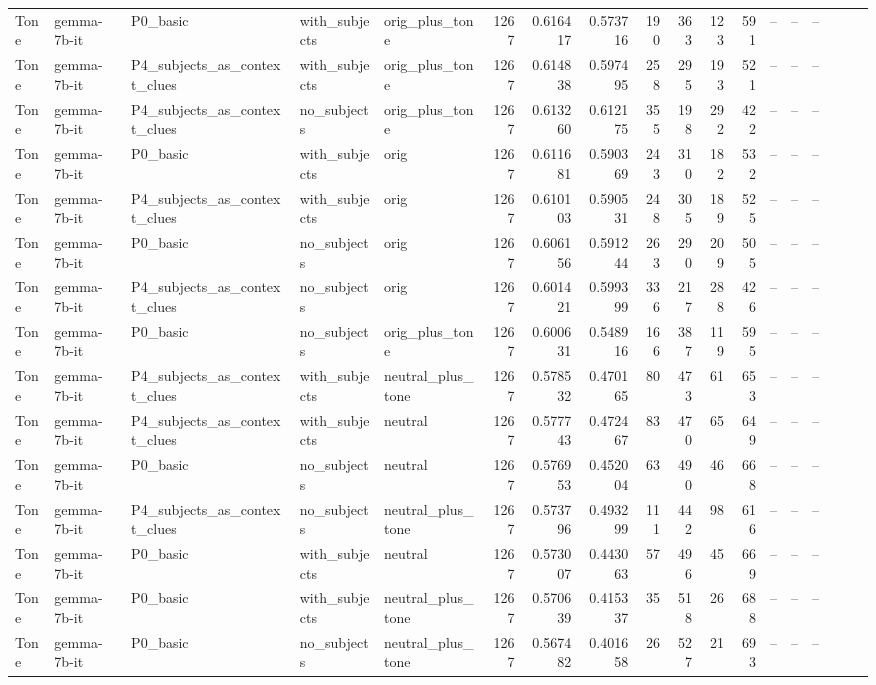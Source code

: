 \begin{landscape}
\begin{longtable}{l P{2.9cm} P{4cm} l P{2.2cm} r r r r r r r r r r r r r}
\midrule
Tone & gemma-7b-it & P0\_basic & with\_subjects & orig\_plus\_tone & 1267 & 0.616417 & 0.573716 & 190 & 363 & 123 & 591 & -- & -- & -- \\
Tone & gemma-7b-it & P4\_subjects\_as\_context\_clues & with\_subjects & orig\_plus\_tone & 1267 & 0.614838 & 0.597495 & 258 & 295 & 193 & 521 & -- & -- & -- \\
Tone & gemma-7b-it & P4\_subjects\_as\_context\_clues & no\_subjects & orig\_plus\_tone & 1267 & 0.613260 & 0.612175 & 355 & 198 & 292 & 422 & -- & -- & -- \\
Tone & gemma-7b-it & P0\_basic & with\_subjects & orig & 1267 & 0.611681 & 0.590369 & 243 & 310 & 182 & 532 & -- & -- & -- \\
Tone & gemma-7b-it & P4\_subjects\_as\_context\_clues & with\_subjects & orig & 1267 & 0.610103 & 0.590531 & 248 & 305 & 189 & 525 & -- & -- & -- \\
Tone & gemma-7b-it & P0\_basic & no\_subjects & orig & 1267 & 0.606156 & 0.591244 & 263 & 290 & 209 & 505 & -- & -- & -- \\
Tone & gemma-7b-it & P4\_subjects\_as\_context\_clues & no\_subjects & orig & 1267 & 0.601421 & 0.599399 & 336 & 217 & 288 & 426 & -- & -- & -- \\
Tone & gemma-7b-it & P0\_basic & no\_subjects & orig\_plus\_tone & 1267 & 0.600631 & 0.548916 & 166 & 387 & 119 & 595 & -- & -- & -- \\
Tone & gemma-7b-it & P4\_subjects\_as\_context\_clues & with\_subjects & neutral\_plus\_tone & 1267 & 0.578532 & 0.470165 & 80 & 473 & 61 & 653 & -- & -- & -- \\
Tone & gemma-7b-it & P4\_subjects\_as\_context\_clues & with\_subjects & neutral & 1267 & 0.577743 & 0.472467 & 83 & 470 & 65 & 649 & -- & -- & -- \\
Tone & gemma-7b-it & P0\_basic & no\_subjects & neutral & 1267 & 0.576953 & 0.452004 & 63 & 490 & 46 & 668 & -- & -- & -- \\
Tone & gemma-7b-it & P4\_subjects\_as\_context\_clues & no\_subjects & neutral\_plus\_tone & 1267 & 0.573796 & 0.493299 & 111 & 442 & 98 & 616 & -- & -- & -- \\
Tone & gemma-7b-it & P0\_basic & with\_subjects & neutral & 1267 & 0.573007 & 0.443063 & 57 & 496 & 45 & 669 & -- & -- & -- \\
Tone & gemma-7b-it & P0\_basic & with\_subjects & neutral\_plus\_tone & 1267 & 0.570639 & 0.415337 & 35 & 518 & 26 & 688 & -- & -- & -- \\
Tone & gemma-7b-it & P0\_basic & no\_subjects & neutral\_plus\_tone & 1267 & 0.567482 & 0.401658 & 26 & 527 & 21 & 693 & -- & -- & -- \\

\end{longtable}
\end{landscape}
